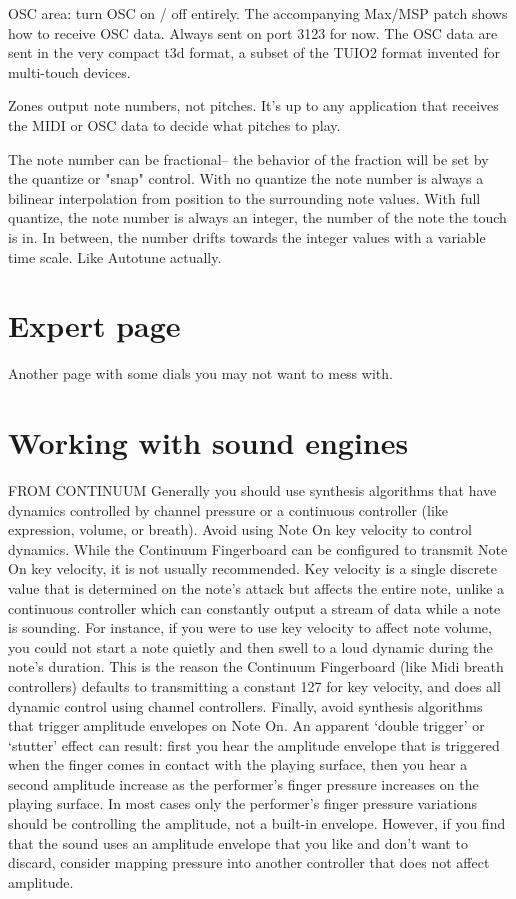 OSC area: turn OSC on / off entirely.  The accompanying Max/MSP patch shows how to receive OSC data.  Always sent on port 3123 for now.  The OSC data are sent in the very compact t3d format, a subset of the TUIO2 format invented for multi-touch devices.  

Zones output note numbers, not pitches.  It's up to any application that receives the MIDI or OSC data to decide what pitches to play. 

The note number can be fractional-- the behavior of the fraction will be set by the quantize or "snap" control.  With no quantize the note number is always a bilinear interpolation from position to the surrounding note values.  With full quantize, the note number is always an integer, the number of the note the touch is in.  In between, the number drifts towards the integer values with a variable time scale.  Like Autotune actually.



\section{Expert page}

Another page with some dials you may not want to mess with.  


\section{Working with sound engines}

FROM CONTINUUM 
Generally you should use synthesis algorithms that have dynamics controlled by channel pressure or a continuous controller (like expression, volume, or breath). Avoid using Note On key velocity to control dynamics. While the Continuum Fingerboard can be configured to transmit Note On key velocity, it is not usually recommended. Key velocity is a single discrete value that is determined on the note’s attack but affects the entire note, unlike a continuous controller which can constantly output a stream of data while a note is sounding. For instance, if you were to use key velocity to affect note volume, you could not start a note quietly and then swell to a loud dynamic during the note's duration. This is the reason the Continuum Fingerboard (like Midi breath controllers) defaults to transmitting a constant 127 for key velocity, and does all dynamic control using channel controllers.
Finally, avoid synthesis algorithms that trigger amplitude envelopes on Note On. An apparent ‘double trigger’ or ‘stutter’ effect can result: first you hear the amplitude envelope that is triggered when the finger comes in contact with the playing surface, then you hear a second amplitude increase as the performer’s finger pressure increases on the playing surface. In most cases only the performer's finger pressure variations should be controlling the amplitude, not a built-in envelope. However, if you find that the sound uses an amplitude envelope that you like and don’t want to discard, consider mapping pressure into another controller that does not affect amplitude.

